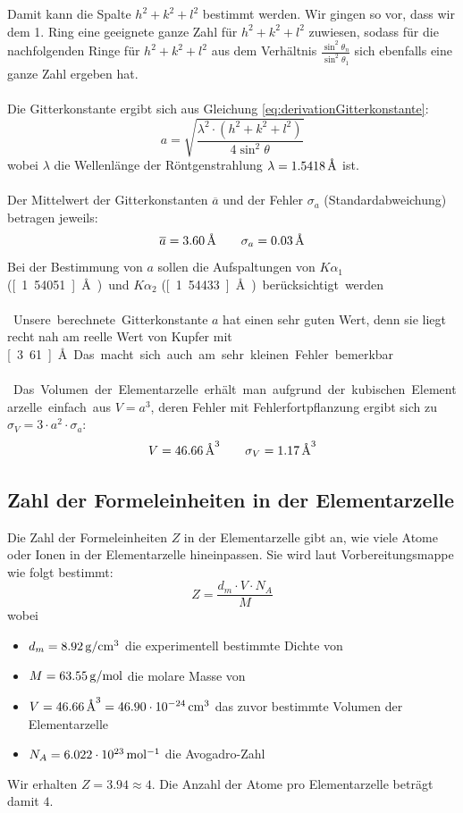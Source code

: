 \documentclass[a4paper,titlepage]{scrartcl}
\newcommand{\angstrom}{\mbox{\normalfont\AA}}
\numberwithin{equation}{section}
\begin{document}
Damit kann die Spalte $h^2+k^2+l^2$ bestimmt werden. Wir gingen so vor, dass wir dem 1. Ring eine geeignete ganze Zahl für $h^2+k^2+l^2$ zuwiesen, sodass für die nachfolgenden Ringe für $h^2+k^2+l^2$ aus dem Verhältnis $\frac{\sin^2 \theta_n}{\sin^2 \theta_1}$ sich ebenfalls eine ganze Zahl ergeben hat.\\ \\
Die Gitterkonstante ergibt sich aus Gleichung \ref{eq:derivationGitterkonstante}:
\begin{equation*}
a=\sqrt{\frac{\lambda^2 \cdot (h^2+k^2+l^2)}{4 \sin^2{\theta}}}
\end{equation*}
wobei $\lambda$ die Wellenlänge der Röntgenstrahlung $\lambda=\unit[1.5418]{\angstrom}$ ist.\\ \\
Der Mittelwert der Gitterkonstanten $\overline{a}$ und der Fehler $\sigma_a$ (Standardabweichung) betragen jeweils:
\begin{equation*}
\overline{a}=\unit[3.60]{\angstrom} \quad \quad \sigma_a=\unit[0.03]{\angstrom}
\end{equation*}
Bei der Bestimmung von $a$ sollen die Aufspaltungen von $K \alpha_1$ (\unit[1.54051]{\angstrom}) und $K \alpha_2$ (\unit[1.54433]{\angstrom}) berücksichtigt werden.\\ \\
Unsere berechnete Gitterkonstante $a$ hat einen sehr guten Wert, denn sie liegt recht nah am reelle Wert von Kupfer  mit \unit[3.61]{\angstrom}. Das macht sich auch am sehr kleinen Fehler bemerkbar.\\ \\
Das Volumen der Elementarzelle erhält man aufgrund der kubischen Elementarzelle einfach aus $V=a^3$, deren Fehler mit Fehlerfortpflanzung ergibt sich zu $\sigma_V=3 \cdot a^2 \cdot \sigma_a$:
\begin{equation*}
V=\unit[46.66]{\angstrom^3} \quad \quad \sigma_V=\unit[1.17]{\angstrom^3}
\end{equation*}
\subsection{Zahl der Formeleinheiten in der Elementarzelle}
Die Zahl der Formeleinheiten $Z$ in der Elementarzelle gibt an, wie viele Atome oder Ionen in der Elementarzelle hineinpassen. Sie wird laut Vorbereitungsmappe wie folgt bestimmt:
\begin{equation*}
Z=\frac{d_m \cdot V \cdot N_A}{M}
\end{equation*}
wobei 
\begin{itemize}
\item $d_m=\unit[8.92]{g/cm^3}$ die experimentell bestimmte Dichte von 
\item $M=\unit[63.55]{g/mol}$ die molare Masse von 
\item $V=\unit[46.66]{\angstrom^3}=\unit[46.90 \cdot 10^{-24}]{cm^3}$ das zuvor bestimmte Volumen der Elementarzelle
\item $N_A=\unit[6.022 \cdot 10^{23}]{mol^{-1}}$ die Avogadro-Zahl
\end{itemize}
Wir erhalten $Z=3.94 \approx 4$. Die Anzahl der Atome pro Elementarzelle beträgt damit $4$.
\end{document}
